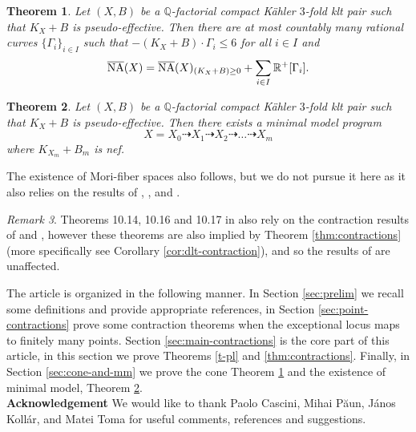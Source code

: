 \documentclass[12pt]{amsart}
\theoremstyle{plain}
\newtheorem{theorem}{Theorem}[section]
\theoremstyle{remark}
\newtheorem{remark}[theorem]{Remark}
\theoremstyle{definition}
\newcommand{\<}{\leq}
\newcommand{\mbQ}{\mathbb{Q}}
\newcommand{\Q}{{\mathbb{Q}}}
\theoremstyle{definition}
\theoremstyle{definition}
\numberwithin{equation}{section}
\theoremstyle{remark}
\begin{document}
\begin{theorem}  \label{t-cone}  Let $(X,B)$ be a $\mbQ$-factorial compact K\"ahler $3$-fold klt pair such that $K_X+B$ is pseudo-effective. Then there are at most countably many rational curves $\{\Gamma _i\}_{i\in I}$ such that $-(K_X+B)\cdot \Gamma _i\leq 6$ for all $i\in I$ and 
 \[\overline{\rm NA}(X)=\overline{\rm NA}(X)_{(K_X+B) \geq 0}+\sum _{i\in I}\mathbb R ^+[\Gamma _i].\]
 \end{theorem}
\begin{theorem}\label{t-mmp-mfs}
    Let $(X,B)$ be a $\Q$-factorial compact K\"ahler $3$-fold klt pair such that $K_X+B$ is pseudo-effective. Then there exists a minimal model program \[X=X_0\dasharrow X_1\dasharrow X_2\dasharrow \ldots \dasharrow X_m\] where $K_{X_m}+B_m$ is nef.
  
\end{theorem}
The existence of Mori-fiber spaces also follows, but we do not pursue it here as it also relies on the results of \cite{Bru06}, \cite{HP15}, and \cite{DH20}.\\


\begin{remark}
Theorems 10.14, 10.16 and 10.17 in \cite{DO23} also rely on the contraction results of \cite{HP16} and \cite{CHP16}, however these theorems are also implied by Theorem \ref{thm:contractions} (more specifically see Corollary \ref{cor:dlt-contraction}), and so the results of \cite{DO23} are unaffected.


\end{remark}



The article is organized in the following manner. In Section \ref{sec:prelim} we recall some definitions and provide appropriate references, in Section \ref{sec:point-contractions} prove some contraction theorems when the exceptional locus maps to finitely many points. Section \ref{sec:main-contractions} is the core part of this article, in this section we prove Theorems \ref{t-pl} and \ref{thm:contractions}. Finally, in Section \ref{sec:cone-and-mm} we prove the cone Theorem \ref{t-cone} and the existence of minimal model, Theorem \ref{t-mmp-mfs}.\\

\noindent
{\bf Acknowledgement } We would like to thank Paolo Cascini, Mihai P\u{a}un, J\'anos Koll\'ar, and Matei Toma for useful comments, references and suggestions. %
\end{document}
